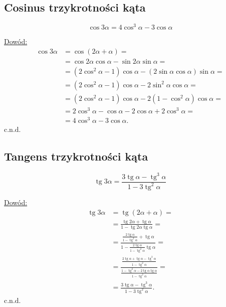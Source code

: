 \documentclass[12pt,a4paper,fleqn]{article}
\DeclareMathOperator{\tg}{tg}
\begin{document}
		\subsection{Cosinus trzykrotności kąta}
		\begin{equation*}
			\cos3\alpha = 4\cos^3\alpha -3\cos\alpha
		\end{equation*}
		
		\underline{Dowód:} \noindent
		\begin{align*}
			\cos3\alpha &= \cos(2\alpha+\alpha) =\\
						&= \cos2\alpha\cos\alpha - \sin2\alpha\sin\alpha = \\
						&= (2\cos^2\alpha - 1)\cos\alpha - (2\sin\alpha\cos\alpha)\sin\alpha = \\
						&= (2\cos^2\alpha - 1)\cos\alpha - 2\sin^2\alpha\cos\alpha =\\
						&= (2\cos^2\alpha - 1)\cos\alpha - 2(1-\cos^2\alpha)\cos\alpha =\\
						&= 2\cos^3\alpha - \cos\alpha - 2\cos\alpha + 2\cos^3\alpha =\\
						&= 4\cos^3\alpha -3\cos\alpha.
		\end{align*}
		c.n.d.

		\subsection{Tangens trzykrotności kąta}
		\begin{equation*}
			\tg3\alpha = \frac{3\tg\alpha-\tg^3\alpha}{1-3\tg^2\alpha}
		\end{equation*}
		
		\underline{Dowód:} \noindent
		\begin{align*}
			\tg3\alpha &= \tg(2\alpha + \alpha) = \\
					   &= \frac{\tg2\alpha+\tg\alpha}{1-\tg2\alpha\tg\alpha} = \\
					   &= \frac{\frac{2\tg \alpha}{1 - \tg^2 \alpha}+\tg\alpha}{1-\frac{2\tg \alpha}{1 - \tg^2 \alpha}\tg\alpha} = \\
					   & = \frac{\frac{2\tg\alpha+\tg\alpha-\tg^3\alpha}{1-\tg^2\alpha}}{\frac{1-\tg^2\alpha - 2\tg\alpha\tg\alpha}{1-\tg^2\alpha}} =\\
					   & = \frac{3\tg\alpha-\tg^3\alpha}{1-3\tg^2\alpha}.
		\end{align*}
		c.n.d.
\end{document}
